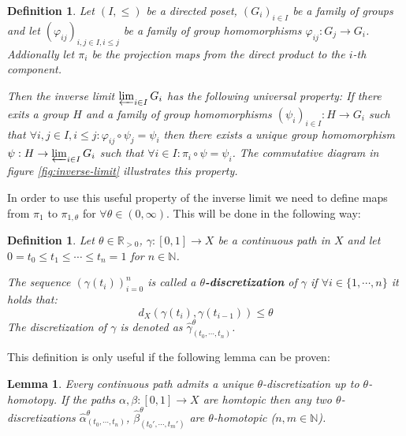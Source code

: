 \documentclass[a4paper, 11pt, twoside]{article}
\newcommand{\R}[0]{\mathbb{R}}
\newcommand{\N}[0]{\mathbb{N}}
\theoremstyle{break}
\theoremstyle{break}
\newtheorem{defin}[thm]{Definition}
\newtheorem{lemma}[thm]{Lemma}
\begin{document}
\begin{defin}
  Let $(I, \leq)$ be a directed poset, $(G_i)_{i\in I}$ be a family of groups and let $(\varphi_{ij})_{i,j \in I, i \leq j}$ be a family of group homomorphisms $\varphi_{ij} \colon G_j \to G_i$.
  Addionally let $\pi_i$ be the projection maps from the direct product to the $i$-th component.
  
  Then the inverse limit $\varprojlim_{i\in I} G_i$ has the following universal property:
  If there exits a group $H$ and a family of group homomorphisms $(\psi_i)_{i\in I}: H \to G_i$ such that $\forall i,j \in I, i \leq j: \varphi_{ij} \circ \psi_j = \psi_i$ then there exists a unique group homomorphism $\psi: H \to \varprojlim_{i\in I} G_i$ such that $\forall i \in I: \pi_i \circ \psi = \psi_i$.
  The commutative diagram in figure \ref{fig:inverse-limit} illustrates this property.
\end{defin}


In order to use this useful property of the inverse limit we need to define maps from $\pi_1$ to $\pi_{1,\theta}$ for $\forall \theta \in (0,\infty)$. This will be done in the following way:
\begin{defin}
  Let $\theta \in \R_{>0}$, $\gamma: [0,1] \to X$ be a continuous path in $X$ and let $0 = t_0 \leq t_1 \leq \cdots \leq t_n = 1$ for $n \in \N$.

  The sequence $(\gamma(t_i))_{i=0}^n$ is called a \textbf{$\theta$-discretization} of $\gamma$ if $\forall i \in \{1, \cdots, n\}$ it holds that:
  \begin{equation*}
    d_X(\gamma(t_{i}), \gamma(t_{i-1})) \leq \theta
  \end{equation*}
  The discretization of $\gamma$ is denoted as $\widehat{\gamma}^{\theta}_{(t_0, \cdots, t_n)}$.
\end{defin}

This definition is only useful if the following lemma can be proven:

\begin{lemma}\label{lem:discretization}
  Every continuous path admits a unique $\theta$-discretization up to $\theta$-homotopy. If the paths $\alpha, \beta: [0,1] \to X$ are homtopic then any two $\theta$-discretizations 
  $\widehat{\alpha}^{\theta}_{(t_0, \cdots, t_n)}$, $\widehat{\beta}^{\theta}_{(t_0', \cdots, t_m')}$ are $\theta$-homotopic ($n,m \in \N$).
\end{lemma}
\end{document}
